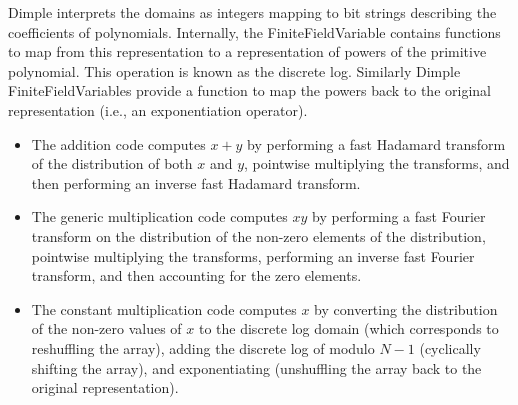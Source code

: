 Dimple interprets the domains as integers mapping to bit strings describing the coefficients of polynomials. Internally, the FiniteFieldVariable contains functions to map from this representation to a representation of powers of the primitive polynomial. This operation is known as the discrete log. Similarly Dimple FiniteFieldVariables provide a function to map the powers back to the original representation (i.e., an exponentiation operator).

\begin{itemize}
\item The addition code computes $x+y$ by performing a fast Hadamard transform of the distribution of both $x$ and $y$, pointwise multiplying the transforms, and then performing an inverse fast Hadamard transform.
\item The generic multiplication code computes $xy$ by performing a fast Fourier transform on the distribution of the non-zero elements of the distribution, pointwise multiplying the transforms, performing an inverse fast Fourier transform, and then accounting for the zero elements.
\item The constant multiplication code computes $x$ by converting the distribution of the non-zero values of $x$ to the discrete log domain (which corresponds to reshuffling the array), adding the discrete log of   modulo $N-1$ (cyclically shifting the array), and exponentiating (unshuffling the array back to the original representation).  
\end{itemize}
